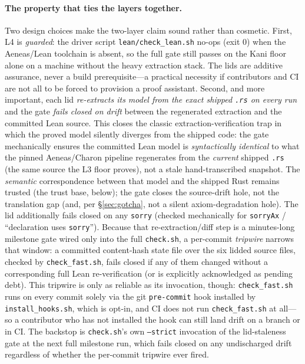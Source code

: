 \documentclass[10pt,twocolumn]{article}
\newcommand{\code}[1]{\texttt{\small #1}}
\begin{document}
\paragraph{The property that ties the layers together.}
Two design choices make the two-layer claim sound rather than cosmetic.
First, L4 is \emph{guarded}: the driver script \code{lean/check\_lean.sh}
no-ops (exit 0) when the Aeneas/Lean toolchain is absent, so the full gate
still passes on the Kani floor alone on a machine without the heavy extraction
stack. The lids are additive assurance, never a build prerequisite---a
practical necessity if contributors and CI are not all to be forced to
provision a proof assistant. Second, and more important, each lid
\emph{re-extracts its model from the exact shipped \code{.rs} on every run}
and the gate \emph{fails closed on drift} between the regenerated extraction
and the committed Lean source. This closes the classic extraction-verification
trap in which the proved model silently diverges from the shipped code: the gate
mechanically ensures the committed Lean model is \emph{syntactically identical}
to what the pinned Aeneas/Charon pipeline regenerates from the \emph{current}
shipped \code{.rs} (the same source the L3 floor proves), not a stale
hand-transcribed snapshot. The \emph{semantic} correspondence between that model
and the shipped Rust remains trusted (the trust base, below); the gate closes
the source-drift hole, not the translation gap (and, per \S\ref{sec:gotcha}, not
a silent axiom-degradation hole). The lid additionally fails closed on any
\code{sorry} (checked mechanically for \code{sorryAx} / ``declaration uses
\code{sorry}''). Because that re-extraction/diff step is a minutes-long
milestone gate wired only into the full \code{check.sh}, a per-commit
\emph{tripwire} narrows that window: a committed content-hash state file over
the six lidded source files, checked by \code{check\_fast.sh}, fails closed if
any of them changed without a corresponding full Lean re-verification (or is
explicitly acknowledged as pending debt). This tripwire is only as reliable as
its invocation, though: \code{check\_fast.sh} runs on every commit solely via
the git \code{pre-commit} hook installed by \code{install\_hooks.sh}, which is
opt-in, and CI does not run \code{check\_fast.sh} at all---so a contributor who
has not installed the hook can still land drift on a branch or in CI. The
backstop is \code{check.sh}'s own \code{--strict} invocation of the
lid-staleness gate at the next full milestone run, which fails closed on any
undischarged drift regardless of whether the per-commit tripwire ever fired.
\end{document}
